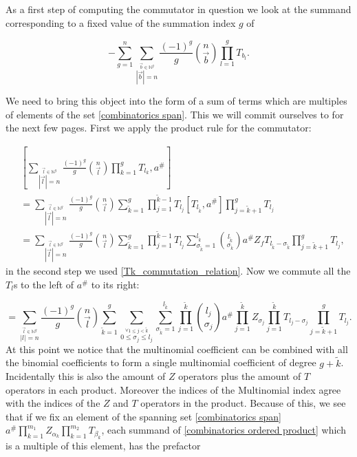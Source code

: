 \documentclass[b5paper,draft,openbib,12pt]{memoir}
\begin{document}
As a first step of computing the commutator in question we look at the summand
corresponding to a fixed value of the summation index \(g\) of 

\begin{equation}\label{combinatorics total sum of T}
-\sum_{g=1}^n \sum_{\stackrel{\vec{b}\in\mathbb{N}^g}{|\vec{b}|=n}}\frac{(-1)^g}{g} 
\binom{n}{\vec{b}} \prod_{l=1}^g T_{b_l}.
\end{equation}

 We need to bring this object into the form of a sum
of terms which are multiples of elements of the set \eqref{combinatorics span}.
This we will commit ourselves to for the next few pages. First we apply
the product rule for the commutator:

\begin{align*}
&\left[ \sum_{\stackrel{\vec{l}\in\mathbb{N}^g}{|\vec{l}|=n}} \frac{(-1)^g}{g} \binom{n}{\vec{l}}
 \prod_{k=1}^g T_{l_k},a^\#\right]\\
 &= \sum_{\stackrel{\vec{l}\in\mathbb{N}^g}{|\vec{l}|=n}} \frac{(-1)^g}{g} \binom{n}{\vec{l}}
 \sum_{\tilde{k}=1}^g \prod_{j=1}^{\tilde{k}-1} T_{l_j} 
 \left[ T_{l_{\tilde{k}}},a^\#\right] \prod_{j=\tilde{k}+1}^g T_{l_j}\\
&=\sum_{\stackrel{\vec{l}\in\mathbb{N}^g}{|\vec{l}|=n}} \frac{(-1)^g}{g} \binom{n}{\vec{l}}
 \sum_{\tilde{k}=1}^g \prod_{j=1}^{\tilde{k}-1} T_{l_j} 
\sum_{\sigma_{\tilde{k}}=1}^{l_{\tilde{k}}} \binom{l_{\tilde{k}}}{\sigma_{\tilde{k}}} 
a^\# Z_f T_{l_{\tilde{k}}-\sigma_{\tilde{k}}} \prod_{j=\tilde{k}+1}^g T_{l_j},
\end{align*}
in the second step we used \eqref{Tk_commutation_relation}. Now we commute
all the \(T_l\)s to the left of \(a^\#\) to its right:

\begin{equation}\label{combinatorics ordered product}
= \sum_{\stackrel{\vec{l}\in\mathbb{N}^g}{|l|=n}} \frac{(-1)^g}{g} \binom{n}{\vec{l}}
\sum_{\tilde{k}=1}^g \sum_{\stackrel{\forall 1\le j <\tilde{k}}{0\le \sigma_{j}\le l_j}}
\sum_{\sigma_{\tilde{k}}=1}^{l_{\tilde{k}}} \prod_{j=1}^{\tilde{k}} \binom{l_j}{\sigma_j}
a^\# \prod_{j=1}^{\tilde{k}} Z_{\sigma_j} \prod_{j=1}^{\tilde{k}} T_{l_j-\sigma_j}
\prod_{j=\tilde{k}+1}^g T_{l_j}.
\end{equation}
At this point we notice that the multinomial coefficient can be combined with all
the binomial coefficients to form a single multinomial coefficient of degree
\(g+\tilde{k}\). Incidentally this is also the amount of \(Z\) operators plus the amount
of \(T\) operators in each product. Moreover the indices of the Multinomial index
agree with the indices of the \(Z\) and \(T\) operators in the product. Because of 
this, we see that if we fix an element of the spanning set \eqref{combinatorics span}
\(a^\# \prod_{k=1}^{m_1} Z_{\alpha_k} \prod_{k=1}^{m_2}T_{\beta_k}\), each 
summand of \eqref{combinatorics ordered product} which is a multiple of
this element, has the prefactor
\end{document}
